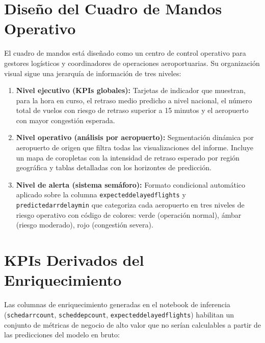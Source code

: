 \documentclass[12pt,oneside,a4paper]{report}
\renewcommand{\_}{\textunderscore\allowbreak}
\begin{document}
\section{Diseño del Cuadro de Mandos Operativo}
\label{sec:dashboard}

El cuadro de mandos está diseñado como un centro de control operativo para gestores logísticos y coordinadores de operaciones aeroportuarias. Su organización visual sigue una jerarquía de información de tres niveles:

\begin{enumerate}
    \item \textbf{Nivel ejecutivo (KPIs globales):} Tarjetas de indicador que muestran, para la hora en curso, el retraso medio predicho a nivel nacional, el número total de vuelos con riesgo de retraso superior a 15 minutos y el aeropuerto con mayor congestión esperada.
    \item \textbf{Nivel operativo (análisis por aeropuerto):} Segmentación dinámica por aeropuerto de origen que filtra todas las visualizaciones del informe. Incluye un mapa de coropletas con la intensidad de retraso esperado por región geográfica y tablas detalladas con los horizontes de predicción.
    \item \textbf{Nivel de alerta (sistema semáforo):} Formato condicional automático aplicado sobre la columna \texttt{expected\_delayed\_flights} y \texttt{predicted\_arr\_delay\_min} que categoriza cada aeropuerto en tres niveles de riesgo operativo con código de colores: verde (operación normal), ámbar (riesgo moderado), rojo (congestión severa).
\end{enumerate}

\section{KPIs Derivados del Enriquecimiento}
\label{sec:kpis_derivados}

Las columnas de enriquecimiento generadas en el notebook de inferencia (\texttt{sched\_arr\_count}, \texttt{sched\_dep\_count}, \texttt{expected\_delayed\_flights}) habilitan un conjunto de métricas de negocio de alto valor que no serían calculables a partir de las predicciones del modelo en bruto:
\end{document}
